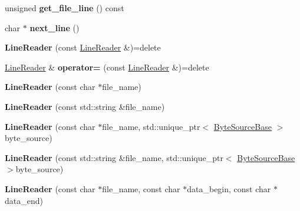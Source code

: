 \begin{DoxyCompactItemize}
unsigned {\bfseries get\+\_\+file\+\_\+line} () const
\item 
\mbox{\label{classio_1_1_line_reader_a97f4e0129611d9da2b8c966ffe670be5}} 
char $\ast$ {\bfseries next\+\_\+line} ()
\item 
\mbox{\label{classio_1_1_line_reader_a84f2957de769bb701eaaddfd8bc004dd}} 
{\bfseries Line\+Reader} (const \hyperlink{classio_1_1_line_reader}{Line\+Reader} \&)=delete
\item 
\mbox{\label{classio_1_1_line_reader_a9ebd7beca16060ffc0ea8df3c0c6ff25}} 
\hyperlink{classio_1_1_line_reader}{Line\+Reader} \& {\bfseries operator=} (const \hyperlink{classio_1_1_line_reader}{Line\+Reader} \&)=delete
\item 
\mbox{\label{classio_1_1_line_reader_a81a75d3f53725d35822f490007520e29}} 
{\bfseries Line\+Reader} (const char $\ast$file\+\_\+name)
\item 
\mbox{\label{classio_1_1_line_reader_ab0eb26f44fa6b18f9c39dfb2561ac882}} 
{\bfseries Line\+Reader} (const std\+::string \&file\+\_\+name)
\item 
\mbox{\label{classio_1_1_line_reader_af4ebb130a7d6c78356573f6d0304266c}} 
{\bfseries Line\+Reader} (const char $\ast$file\+\_\+name, std\+::unique\+\_\+ptr$<$ \hyperlink{classio_1_1_byte_source_base}{Byte\+Source\+Base} $>$byte\+\_\+source)
\item 
\mbox{\label{classio_1_1_line_reader_ab625b3a8001dca811b0e211c6cfc1b28}} 
{\bfseries Line\+Reader} (const std\+::string \&file\+\_\+name, std\+::unique\+\_\+ptr$<$ \hyperlink{classio_1_1_byte_source_base}{Byte\+Source\+Base} $>$byte\+\_\+source)
\item 
\mbox{\label{classio_1_1_line_reader_ad5a65d6f23474884061a77ea858c042b}} 
{\bfseries Line\+Reader} (const char $\ast$file\+\_\+name, const char $\ast$data\+\_\+begin, const char $\ast$data\+\_\+end)
\item 
\mbox{\label{classio_1_1_line_reader_a0a52d864b46442a253443cac1367366e}} 

\end{DoxyCompactItemize}
